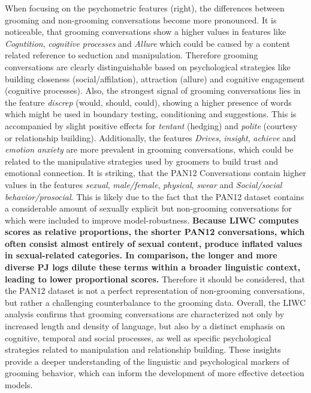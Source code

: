 When focusing on the psychometric features (right), the differences between grooming and non-grooming conversations become more pronounced. It is noticeable, that grooming conversations show a higher values in features like \textit{Cogntition}, \textit{cognitive processes} and \textit{Allure} which could be caused by a content related reference to seduction and manipulation. Therefore grooming conversations are clearly distinguishable based on psychological strategies like building closeness (social/affilation), attraction (allure) and cognitive engagement (cognitive processes). Also, the strongest signal of grooming conversations lies in the feature \textit{discrep} (would, should, could), showing a higher presence of words which might be used in boundary testing, conditioning and suggestions. This is accompanied by slight positive effects for \textit{tentant} (hedging) and \textit{polite} (courtesy or relationship building). Additionally, the features \textit{Drives}, \textit{insight}, \textit{achieve} and \textit{emotion anxiety} are more prevalent in grooming conversations, which could be related to the manipulative strategies used by groomers to build trust and emotional connection.
It is striking, that the PAN12 Conversations contain higher values in the features \textit{sexual}, \textit{male/female}, \textit{physical}, \textit{swear} and \textit{Social/social behavior/prosocial}. This is likely due to the fact that the PAN12 dataset contains a considerable amount of sexually explicit but non-grooming conversations for which were included to improve model-robustness. \textbf{Because LIWC computes scores as relative proportions, the shorter PAN12 conversations, which often consist almost entirely of sexual content, produce inflated values in sexual-related categories. In comparison, the longer and more diverse PJ logs dilute these terms within a broader linguistic context, leading to lower proportional scores.} Therefore it should be considered, that the PAN12 dataset is not a perfect representation of non-grooming conversations, but rather a challenging counterbalance to the grooming data. Overall, the LIWC analysis confirms that grooming conversations are characterized not only by increased length and density of language, but also by a distinct emphasis on cognitive, temporal and social processes, as well as specific psychological strategies related to manipulation and relationship building. These insights provide a deeper understanding of the linguistic and psychological markers of grooming behavior, which can inform the development of more effective detection models.


